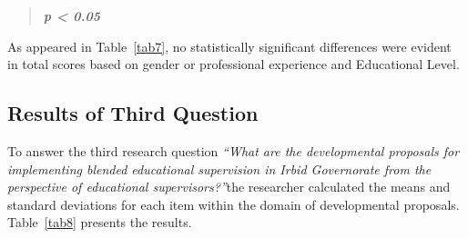 \documentclass[10pt]{NSP1}
\begin{document}
\begin{quote}
\emph{\textbf{p \textless{} 0.05}}
\end{quote}

As appeared in Table~\ref{tab7}, no statistically significant differences were evident in total scores based on gender or professional experience and Educational Level.

\subsection{Results of Third Question}

To answer the third research question \emph{``What are the developmental proposals for implementing blended educational supervision in Irbid Governorate from the perspective of educational supervisors?''}the researcher calculated the means and standard deviations for each item within the domain of developmental proposals. Table~\ref{tab8} presents the results.
\clearpage
\end{document}
